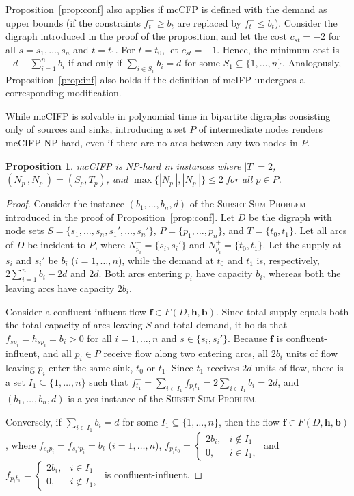 \documentclass[pdflatex,sn-mathphys-num]{sn-jnl}%
\theoremstyle{thmstyleone}%
\newtheorem{proposition}[theorem]{Proposition}%
\begin{document}
Proposition~\ref{prop:conf} also applies if mcCFP is defined with the demand as upper bounds
(if the constraints $f_t^-\geq b_t$ are replaced by $f_t^-\leq b_t$).
Consider the digraph introduced in the proof of the proposition, and let the cost $c_{st}=-2$ for all $s=s_1,\ldots,s_n$ and $t=t_1$.
For $t=t_0$, let $c_{st}=-1$.
Hence, the minimum cost is $-d-\sum_{i=1}^nb_i$ if and only if $\sum_{i\in S_1}b_i=d$ for some $S_1\subseteq\{1,\ldots,n\}$.
Analogously, Proposition~\ref{prop:inf} also holds if the definition of mcIFP undergoes a corresponding modification.

While mcCIFP is solvable in polynomial time in bipartite digraphs consisting only of sources and sinks,
introducing a set $P$ of intermediate nodes renders mcCIFP NP-hard, even if there are no arcs between any two nodes in $P$.
\begin{proposition} \label{prop:confinf}
mcCIFP is NP-hard in instances where $|T|=2$, $(N_p^-,N_p^+)=(S_p,T_p)$, and $\max\{|N_p^-|,|N_p^+|\}\leq 2$ for all $p\in P$.
\end{proposition}
\begin{proof}
Consider the instance $(b_1,\ldots,b_n,d)$ of the \textsc{Subset Sum Problem} introduced in the proof of Proposition~\ref{prop:conf}.
Let $D$ be the digraph with node sets $S=\{s_1,\ldots,s_n,s_1',\ldots,s_n'\}$, $P=\{p_1,\ldots,p_n\}$, and $T=\{t_0,t_1\}$.
Let all arcs of $D$ be incident to $P$, where $N_{p_i}^-=\{s_i,s_i'\}$ and  $N_{p_i}^+=\{t_0,t_1\}$.
Let the supply at $s_i$ and $s_i'$ be $b_i$ ($i=1,\ldots,n$), while the demand at $t_0$ and $t_1$ is, respectively, $2\sum_{i=1}^nb_i-2d$ and $2d$.
Both arcs entering $p_i$ have capacity $b_i$, whereas both the leaving arcs have capacity $2b_i$.

Consider a confluent-influent flow $\boldsymbol{f}\in F(D,\boldsymbol{h},\boldsymbol{b})$.
Since total supply equals both the total capacity of arcs leaving $S$ and total demand, it holds that $f_{sp_i}=h_{sp_i}=b_i>0$ for all $i=1,\ldots,n$ and $s\in\{s_i,s_i'\}$.
Because $\boldsymbol{f}$ is confluent-influent, and all $p_i\in P$ receive flow along two entering arcs,
all $2b_i$ units of flow leaving $p_i$ enter the same sink, $t_0$ or $t_1$.
Since $t_1$ receives $2d$ units of flow, there is a set $I_1\subseteq \{1,\ldots,n\}$ such that $f_{t_1}^-=\sum_{i\in I_1}f_{p_it_1}=2\sum_{i\in I_1}{b_i}=2d$,
and $(b_1,\ldots,b_n,d)$ is a yes-instance  of the \textsc{Subset Sum Problem}.

Conversely, if $\sum_{i\in I_1}b_i=d$ for some $I_1\subseteq\{1,\ldots,n\}$, then the flow $\boldsymbol{f}\in F(D,\boldsymbol{h},\boldsymbol{b})$, where $f_{s_ip_i}=f_{s_i'p_i}=b_i$ ($i=1,\ldots,n$),
$f_{p_it_0}=\left\{\begin{array}{lr}2b_i, & i\notin I_1 \\ 0, & i\in I_1,\end{array}\right.$ and
$f_{p_it_1}=\left\{\begin{array}{lr}2b_i, & i\in I_1 \\ 0, & i\notin I_1,\end{array}\right.$ is confluent-influent.
\end{proof}
\end{document}
